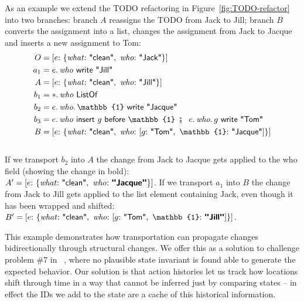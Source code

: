 \documentclass[english,submission]{programming}
\theoremstyle{definition}
\newcommand{\citet}[1]{\citeauthor*{#1}~\cite{#1}}
\newcommand{\mathbox}[1]{\colorbox{black!10}{$#1$}}
\DeclareMathOperator{\exec}{\ \fatsemi\ \ }
\newcommand{\is}{{:}\ }
\newcommand{\comma}{,\ }
\newcommand{\quotedstring}[1]{\textsf{\textquotedbl{#1}\textquotedbl}}
\begin{document}
As an example we extend the TODO refactoring in Figure~\ref{fig:TODO-refactor} into two branches: branch $A$ reassigns the TODO from Jack to Jill; branch $B$ converts the assignment into a list, changes the assignment from Jack to Jacque and inserts a new assignment to Tom:
\begin{align*}
  O &= [
    e \is \{ \mathit{what}\is \quotedstring{clean}\comma  \mathit{who}\is \quotedstring{Jack} \}
    ] \\
  a_1 &= e\ldotp\mathit{who}\textsf{ write } \quotedstring{Jill}\\
  A &= [
    e \is \{ \mathit{what}\is \quotedstring{clean}\comma  \mathit{who}\is \quotedstring{Jill} \}
    ] \\
  b_1 &= *\ldotp \mathit{who} \textsf{ ListOf } \\
  b_2 &= e\ldotp\mathit{who}\ldotp\mathbb{1} \textsf{ write } \quotedstring{Jacque} \\
  b_3 &= e\ldotp\mathit{who} \textsf{ insert } g \textsf{ before } \mathbb{1} \exec e\ldotp\mathit{who}\ldotp g \textsf{ write } \quotedstring{Tom} \\
  B &= [
    e \is \{ \mathit{what}\is \quotedstring{clean}\comma  \mathit{who}\is
    [ g \is \quotedstring{Tom} \comma \mathbb{1}\is \quotedstring{Jacque}] \}
    ] \\
  \end{align*}
  \vspace{-30pt}\\
If we transport $b_2$ into $A$ the change from Jack to Jacque gets applied to the \textsf{who} field (showing the change in bold):\\
\mathbox{A' =
[e \is \{ \mathit{what}\is \quotedstring{clean}\comma  \mathit{who}\is \textbf{\quotedstring{Jacque}} \}]}.
If we transport $a_1$ into $B$ the change from Jack to Jill gets applied to the list element containing Jack, even though it has been wrapped and shifted:\\
\mathbox{B' = [
    e \is \{ \mathit{what}\is \quotedstring{clean}\comma  \mathit{who}\is
    [ g \is \quotedstring{Tom} \comma \mathbb{1}\is \textbf{\quotedstring{Jill}}] \}
]}.

This example demonstrates how transportation can propagate changes bidirectionally through structural changes. We offer this as a solution to challenge problem \#7 in \citet{challenge-problems}, where no plausible state invariant is found able to generate the expected behavior. Our solution is that action histories let us track how locations shift through time in a way that cannot be inferred just by comparing states -- in effect the IDs we add to the state are a cache of this historical information.
\end{document}
